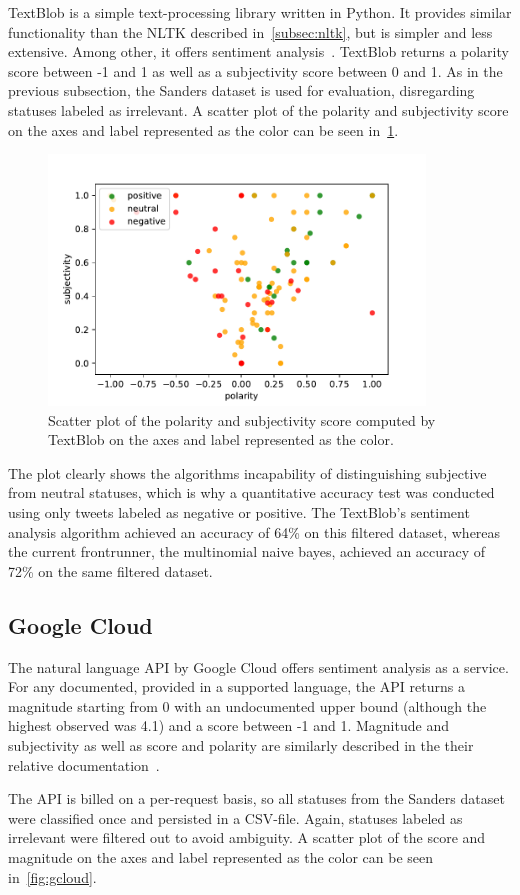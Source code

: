 TextBlob is a simple text-processing library written in Python.
It provides similar functionality than the NLTK described in~\ref{subsec:nltk},
but is simpler and less extensive.
Among other, it offers sentiment analysis~\cite{textblobDocs}.
TextBlob returns a polarity score between -1 and 1 as well as a subjectivity score between 0 and 1.
As in the previous subsection, the Sanders dataset is used for evaluation, disregarding statuses labeled as irrelevant.
A scatter plot of the polarity and subjectivity score on the axes and label represented as the color can be seen in~\ref{fig:textblob}.


\begin{figure}
    \centering
    \caption{Scatter plot of the polarity and subjectivity score computed by TextBlob on the axes and label represented as the color.}
    \label{fig:textblob}
    \includegraphics[width=10cm]{../figures/textblob.pdf}
\end{figure}

The plot clearly shows the algorithms incapability of distinguishing subjective from neutral statuses,
which is why a quantitative accuracy test was conducted using only tweets labeled as negative or positive.
The TextBlob's sentiment analysis algorithm achieved an accuracy of 64\% on this filtered dataset,
whereas the current frontrunner, the multinomial naive bayes, achieved an accuracy of 72\% on the same filtered dataset.

\subsection{Google Cloud}
\label{subsec:googlecloud} %

The natural language API by Google Cloud offers sentiment analysis as a service.
For any documented, provided in a supported language, the API returns a magnitude starting from 0 with an undocumented upper bound
(although the highest observed was 4.1) and a score between -1 and 1.
Magnitude and subjectivity as well as score and polarity are similarly described in the their relative documentation~\cite{gcloudDocs}\cite{textblobDocs}.
\par
The API is billed on a per-request basis, so all statuses from the Sanders dataset were classified once and persisted in a CSV-file.
Again, statuses labeled as irrelevant were filtered out to avoid ambiguity.
A scatter plot of the score and magnitude on the axes and label represented as the color can be seen in~\ref{fig:gcloud}.

